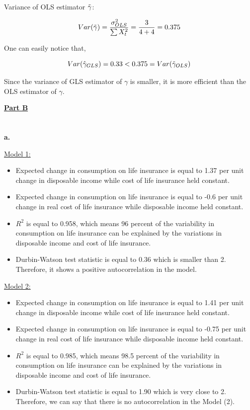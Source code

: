 \documentclass{article}
\begin{document}
Variance of OLS estimator $\Tilde{\gamma}$:

\begin{equation}
    Var(\Tilde{\gamma}) = \frac{\sigma^2_{OLS}}{\sum X_t^2} = \frac{3}{4 + 4} = 0.375
\end{equation}

One can easily notice that,

\begin{equation}
    Var(\hat{\gamma}_{GLS}) = 0.33 < 0.375 = Var(\Tilde{\gamma}_{OLS})
\end{equation}

Since the variance of GLS estimator of $\gamma$ is smaller, it is more efficient than the OLS estimator of $\gamma$.


\newpage

\Large
\underline{\textbf{Part B}}
\small

\setcounter{section}{1}

\section{}

\textbf{a.}

\underline{Model 1:}

\begin{itemize}
    \item Expected change in consumption on life insurance is equal to 1.37 per unit change in disposable income while cost of life insurance held constant.
    \item Expected change in consumption on life insurance is equal to -0.6 per unit change in real cost of life insurance while disposable income held constant.
    \item $R^2$ is equal to 0.958, which means 96 percent of the variability in consumption on life insurance can be explained by the variations in disposable income and cost of life insurance.
    \item Durbin-Watson test statistic is equal to 0.36 which is smaller than 2. Therefore, it shows a positive autocorrelation in the model.
\end{itemize}


\underline{Model 2:}

\begin{itemize}
     \item Expected change in consumption on life insurance is equal to 1.41 per unit change in disposable income while cost of life insurance held constant.
    \item Expected change in consumption on life insurance is equal to -0.75 per unit change in real cost of life insurance while disposable income held constant.
    \item $R^2$ is equal to 0.985, which means 98.5 percent of the variability in consumption on life insurance can be explained by the variations in disposable income and cost of life insurance.
    \item Durbin-Watson test statistic is equal to 1.90 which is very close to 2. Therefore, we can say that there is no autocorrelation in the Model (2).
\end{itemize}
\end{document}

